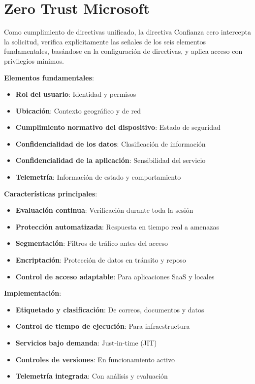 \section{Zero Trust Microsoft}

Como cumplimiento de directivas unificado, la directiva Confianza cero intercepta la solicitud, verifica explícitamente las señales de los seis elementos fundamentales, basándose en la configuración de directivas, y aplica acceso con privilegios mínimos.

\textbf{Elementos fundamentales}:
\begin{itemize}
    \item \textbf{Rol del usuario}: Identidad y permisos
    \item \textbf{Ubicación}: Contexto geográfico y de red
    \item \textbf{Cumplimiento normativo del dispositivo}: Estado de seguridad
    \item \textbf{Confidencialidad de los datos}: Clasificación de información
    \item \textbf{Confidencialidad de la aplicación}: Sensibilidad del servicio
    \item \textbf{Telemetría}: Información de estado y comportamiento
\end{itemize}

\textbf{Características principales}:
\begin{itemize}
    \item \textbf{Evaluación continua}: Verificación durante toda la sesión
    \item \textbf{Protección automatizada}: Respuesta en tiempo real a amenazas
    \item \textbf{Segmentación}: Filtros de tráfico antes del acceso
    \item \textbf{Encriptación}: Protección de datos en tránsito y reposo
    \item \textbf{Control de acceso adaptable}: Para aplicaciones SaaS y locales
\end{itemize}

\textbf{Implementación}:
\begin{itemize}
    \item \textbf{Etiquetado y clasificación}: De correos, documentos y datos
    \item \textbf{Control de tiempo de ejecución}: Para infraestructura
    \item \textbf{Servicios bajo demanda}: Just-in-time (JIT)
    \item \textbf{Controles de versiones}: En funcionamiento activo
    \item \textbf{Telemetría integrada}: Con análisis y evaluación
\end{itemize}

